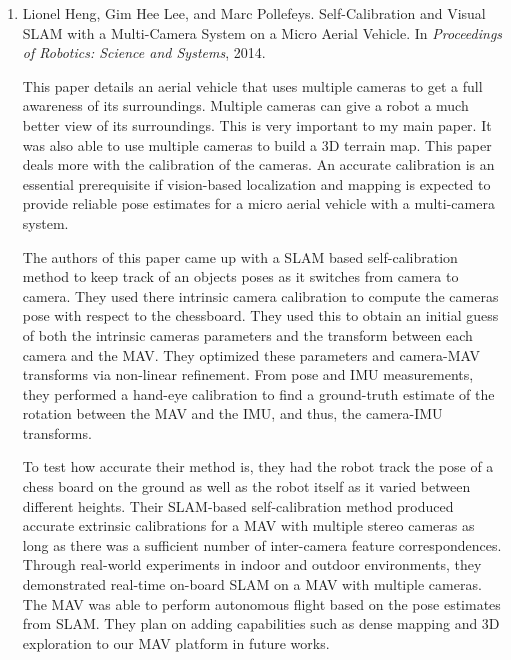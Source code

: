 \documentclass[12pt]{article}
\begin{document}
\begin{enumerate}
\item Lionel Heng, Gim Hee Lee, and Marc Pollefeys. Self-Calibration and Visual SLAM with a Multi-Camera System on a Micro Aerial Vehicle. In \textit{Proceedings of Robotics: Science and Systems}, 2014. \newline \newline


	This paper details an aerial vehicle that uses multiple cameras to get a full 
	awareness of its surroundings. Multiple cameras can give a robot a much better view of 
	its surroundings. This is very important to my main paper. It was also able to use 
	multiple cameras to build a 3D terrain map. This paper deals more with the calibration 
	of the cameras. An accurate calibration is an essential prerequisite if vision-based 
	localization and mapping is expected to provide reliable pose estimates for a micro 
	aerial vehicle with a multi-camera system. \newline

	The authors of this paper came up with a SLAM based self-calibration method to keep 
	track of an objects poses as it switches from camera to camera. They used there 
	intrinsic camera calibration to compute the cameras pose with respect to the 
	chessboard. They used this to obtain an initial guess of both the intrinsic cameras 
	parameters and the transform between each camera and the MAV. They optimized these 
	parameters and camera-MAV transforms via non-linear refinement. From pose and IMU 
	measurements, they performed a hand-eye calibration to find a ground-truth estimate of 
	the rotation between the MAV and the IMU, and thus, the camera-IMU transforms. \newline

	To test how accurate their method is, they had the robot track the pose of a chess 
	board on the ground as well as the robot itself as it varied between different 
	heights. Their SLAM-based self-calibration method produced accurate extrinsic 
	calibrations for a MAV with multiple stereo cameras as long as there was a sufficient 
	number of inter-camera feature correspondences. Through real-world experiments in 
	indoor and outdoor environments, they demonstrated real-time on-board SLAM on a MAV 
	with multiple cameras. The MAV was able to perform autonomous flight based on the pose 
	estimates from SLAM. They plan on adding capabilities such as dense mapping and 3D 
	exploration to our MAV platform in future works. \newline




\end{enumerate}
\end{document}
